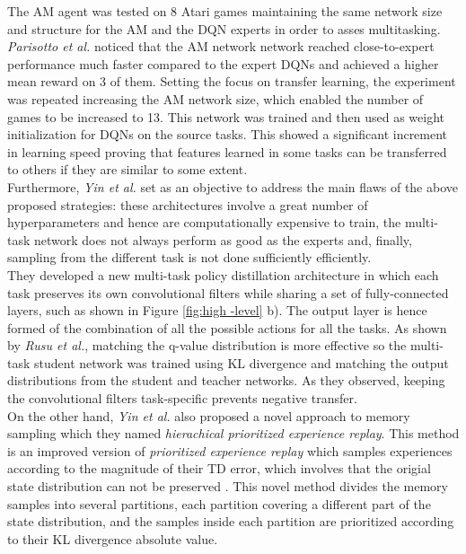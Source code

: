 \documentclass{article}
\begin{document}
The AM agent was tested on 8 Atari games maintaining the same network size and structure for the AM and the DQN experts in order to asses multitasking. \textit{Parisotto et al.} noticed that the AM network network reached close-to-expert performance much faster compared to the expert DQNs and achieved a higher mean reward on 3 of them. Setting the focus on transfer learning, the experiment was repeated increasing the AM network size, which enabled the number of games to be increased to 13. This network was trained and then used as weight initialization for DQNs on the source tasks. This showed a significant increment in learning speed proving that features learned in some tasks can be transferred to others if they are similar to some extent.\\

Furthermore, \textit{Yin et al.} \citep{YinKnowledgeReplay} set as an objective to address the main flaws of the above proposed strategies: these architectures involve a great number of hyperparameters and hence are computationally expensive to train, the multi-task network does not always perform as good as the experts and, finally, sampling from the different task is not done sufficiently efficiently.\\
They developed a new multi-task policy distillation architecture in which each task preserves its own convolutional filters while sharing a set of fully-connected layers, such as shown in Figure \ref{fig:high -level} b). The output layer is hence formed of the combination of all the possible actions for all the tasks. As shown by \textit{Rusu et al.}, matching the q-value distribution is more effective so the multi-task student network was trained using KL divergence and matching the output distributions from the student and teacher networks. As they observed, keeping the convolutional filters task-specific prevents negative transfer.\\
On the other hand, \textit{Yin et al.} also proposed a novel approach to memory sampling which they named \textit{hierachical prioritized experience replay}. This method is an improved version of \textit{prioritized experience replay} \citep{Schaul2015PrioritizedReplay} which samples experiences according to the magnitude of their TD error, which involves that the origial state distribution can not be preserved \cite{YinKnowledgeReplay}. This novel method divides the memory samples into several partitions, each partition covering a different part of the state distribution, and the samples inside each partition are prioritized according to their KL divergence absolute value.\\
\end{document}
